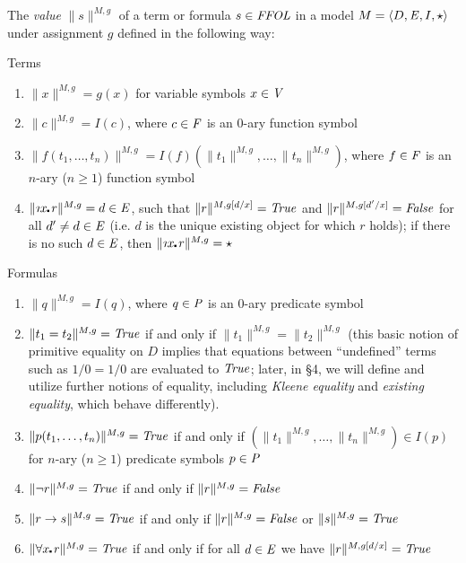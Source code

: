 \begin{definition}
  The \emph{value} $\| s \|^{M,g}$ of a term or formula $s\in\FFOL$
  in a model $M=\langle D, \ex, I, \star\rangle$ under assignment $g$ 
  defined in the following way:
\noindent
\begin{description}
\item{Terms}
\begin{enumerate}
\item $\| x \|^{M,g} = g(x)$ for variable symbols $x\in\V$
\item $\| c \|^{M,g} = I(c)$, where $c\in\F$ is an $0$-ary function symbol
\item $\| f(t_1,\ldots,t_n)\|^{M,g} = I(f)(\| t_1 \|^{M,g},\ldots,\|
  t_n \|^{M,g})$, where $f\in\F$ is an $n$-ary ($n\geq 1$) function symbol
\item $\| \Descr x\lambdot r \|^{M,g} = d \in \ex$, such that $\| r
  \|^{M,g[d/x]} = \True$ and  $\| r
  \|^{M,g[d'/x]} = \False$ for all $d'\not=d\in \ex$ (i.e. $d$ is the
  unique existing object for which $r$ holds); if there is no
  such $d\in \ex$, then $\| \Descr x\lambdot r \|^{M,g} = \star$
 \setcounter{enumTemp}{\theenumi}
\end{enumerate}

\item{Formulas}
\begin{enumerate}
\setcounter{enumi}{\theenumTemp}
\item $\| q \|^{M,g} = I(q)$, where $q\in\P$ is an $0$-ary predicate
  symbol
\item $\| t_1 = t_2 \|^{M,g} = \True$ if and only if $\| t_1 \|^{M,g} = \| t_2
  \|^{M,g}$ (this basic notion of primitive equality on $D$ implies
  that equations between ``undefined'' terms such as $1/0 = 1/0$ are
  evaluated to $\True$; later, in \S4, we will
  define and utilize further notions of equality, including \emph{Kleene equality}
  and \emph{existing equality}, which behave differently).
\item $\| p(t_1,\ldots,t_n) \|^{M,g} = \True$ if and only if $(\| t_1 \|^{M,g},\ldots,\|
  t_n \|^{M,g}) \in I(p)$ for $n$-ary ($n\geq 1$) predicate symbols
  $p\in\P$
\item $\| \neg r \|^{M,g} = \True$ if and only if $\| r \|^{M,g} = \False$
\item $\| r \Impl s \|^{M,g} = \True$ if and only if $\| r \|^{M,g} = \False$
  or $\| s \|^{M,g} = \True$
\item $\| \forall x\lambdot r  \|^{M,g} = \True$ if and only if for all $d \in \ex$ we
  have $\|  r  \|^{M,g[d/x]} = \True$ %
\end{enumerate}
\end{description}

\end{definition}
 


